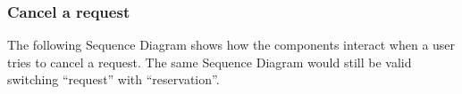 \documentclass{article}
\begin{document}
	\subsubsection{Cancel a request}
	The following Sequence Diagram shows how the components interact when a user tries to cancel a request. The same Sequence Diagram would still be valid switching ``request'' with ``reservation''. 
	\begin{figure}[H]
	\end{figure}
\end{document}
